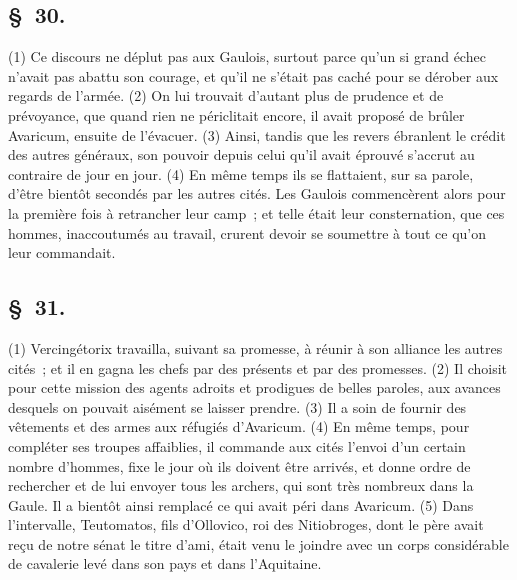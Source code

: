 \documentclass[french,twoside]{book} %
\begin{document}
\subsection[{§ 30.}]{ \textsc{§ 30.} }
\noindent (1) Ce discours ne déplut pas aux Gaulois, surtout parce qu’un si grand échec n’avait pas abattu son courage, et qu’il ne s’était pas caché pour se dérober aux regards de l’armée. (2) On lui trouvait d’autant plus de prudence et de prévoyance, que quand rien ne périclitait encore, il avait proposé de brûler Avaricum, ensuite de l’évacuer. (3) Ainsi, tandis que les revers ébranlent le crédit des autres généraux, son pouvoir depuis celui qu’il avait éprouvé s’accrut au contraire de jour en jour. (4) En même temps ils se flattaient, sur sa parole, d’être bientôt secondés par les autres cités. Les Gaulois commencèrent alors pour la première fois à retrancher leur camp ; et telle était leur consternation, que ces hommes, inaccoutumés au travail, crurent devoir se soumettre à tout ce qu’on leur commandait.
\subsection[{§ 31.}]{ \textsc{§ 31.} }
\noindent (1) Vercingétorix travailla, suivant sa promesse, à réunir à son alliance les autres cités ; et il en gagna les chefs par des présents et par des promesses. (2) Il choisit pour cette mission des agents adroits et prodigues de belles paroles, aux avances desquels on pouvait aisément se laisser prendre. (3) Il a soin de fournir des vêtements et des armes aux réfugiés d’Avaricum. (4) En même temps, pour compléter ses troupes affaiblies, il commande aux cités l’envoi d’un certain nombre d’hommes, fixe le jour où ils doivent être arrivés, et donne ordre de rechercher et de lui envoyer tous les archers, qui sont très nombreux dans la Gaule. Il a bientôt ainsi remplacé ce qui avait péri dans Avaricum. (5) Dans l’intervalle, Teutomatos, fils d’Ollovico, roi des Nitiobroges, dont le père avait reçu de notre sénat le titre d’ami, était venu le joindre avec un corps considérable de cavalerie levé dans son pays et dans l’Aquitaine.
\end{document}
